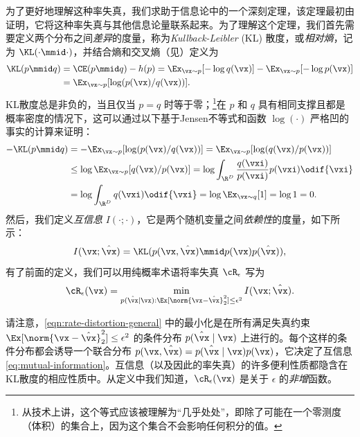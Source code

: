 \documentclass[../../book-main_zh.tex]{subfiles}
\begin{document}
为了更好地理解这种率失真，我们求助于信息论中的一个深刻定理，该定理最初由 \textcite{shannon1959coding} 证明，它将这种率失真与其他信息论量联系起来。为了理解这个定理，我们首先需要定义两个分布之间\textit{差异}的度量，称为\textit{Kullback-Leibler} (KL) 散度，或\textit{相对熵}，记为 \(\KL(\cdot \mmid \cdot)\)，并结合熵和交叉熵（见）定义为
\begin{align}
    \KL(p \mmid q) &= \CE(p \mmid q) - h(p) = \Ex_{\vx \sim p}[-\log
    q(\vx)] - \Ex_{\vx \sim p}[-\log p(\vx)] \\
    &= \Ex_{\vx \sim p}[\log (p(\vx)/q(\vx))].
\end{align}
KL散度总是非负的，当且仅当 \(p = q\) 时等于零；\footnote{从技术上讲，这个等式应该被理解为“几乎处处”，即除了可能在一个零测度（体积）的集合上，因为这个集合不会影响任何积分的值。}在 \(p\) 和 \(q\) 具有相同支撑且都是概率密度的情况下，这可以通过以下基于Jensen不等式和函数 \(\log(\cdot)\) 严格凹的事实的计算来证明：
\begin{align}
    - \KL(p\mmid q)
    &= -\Ex_{\vx \sim p}[\log(p(\vx)/q(\vx))] = \Ex_{\vx \sim
    p}[\log(q(\vx)/p(\vx))] \\
    &\leq \log \Ex_{\vx \sim p}[q(\vx)/p(\vx)] =  \log \int_{\R^{D}}
    \frac{q(\vxi)}{p(\vxi)}p(\vxi)\odif{\vxi} \\
    &= \log \int_{\R^{D}}q(\vxi)\odif{\vxi} = \log \Ex_{\vx \sim
    q}[1] = \log 1 = 0.
\end{align}
然后，我们定义\textit{互信息} \(I(\cdot; \cdot)\)，它是两个随机变量之间\textit{依赖性}的度量，如下所示：
\begin{equation}\label{eq:mutual-information}
    I(\vx; \hat{\vx})
    = \KL(p(\vx, \hat{\vx}) \mmid p(\vx) p(\hat{\vx})),
\end{equation}
有了前面的定义，我们可以用纯概率术语将率失真 \(\cR_{\epsilon}\) 写为
\begin{equation}
    \cR_{\epsilon}(\vx)
    = \min_{p(\hat \vx \mid \vx): \Ex[\norm{\vx -\hat \vx}_2^{2}] \le
    \epsilon^{2}}
    I(\vx; \hat{\vx}).
    \label{eqn:rate-distortion-general}
\end{equation}

请注意，\eqref{eqn:rate-distortion-general} 中的最小化是在所有满足失真约束 $\Ex[\norm{\vx- \hat \vx}_2^{2}] \le \epsilon^{2}$ 的条件分布 $p(\hat \vx \mid \vx)$ 上进行的。每个这样的条件分布都会诱导一个联合分布 $p(\vx, \hat{\vx}) = p(\hat\vx \mid \vx) p(\vx)$，它决定了互信息 \eqref{eq:mutual-information}。互信息（以及因此的率失真）的许多便利性质都隐含在KL散度的相应性质中。从定义中我们知道，$\cR_{\epsilon}(\vx)$ 是关于 $\epsilon$ 的{\em 非增}函数。
\end{document}
